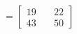 \documentclass[preview]{standalone}
\begin{document}
\begin{align*}
=\begin{bmatrix} 19 & \quad 22 \\ 43 & \quad 50 \end{bmatrix}
\end{align*}
\end{document}
